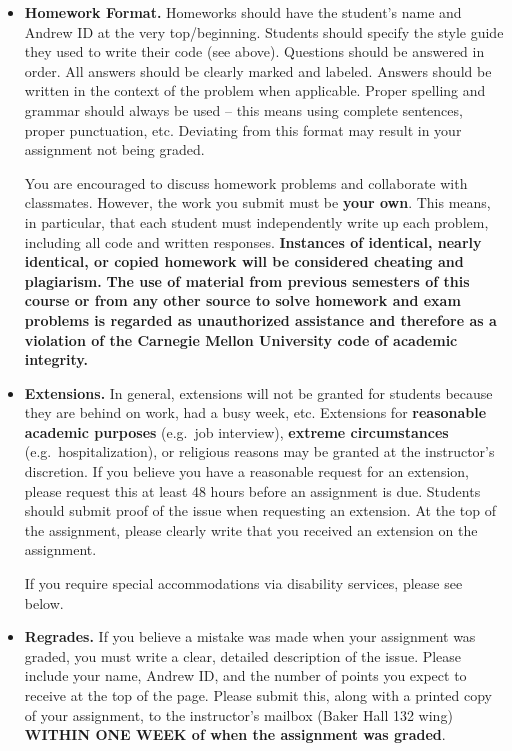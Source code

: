 \documentclass[11pt]{article}
\begin{document}
\begin{itemize}
\item {\bf Homework Format.}  Homeworks should have the student's name and Andrew ID at the very top/beginning.  Students should specify the style guide they used to write their code (see above).  Questions should be answered in order.  All answers should be clearly marked and labeled.  Answers should be written in the context of the problem when applicable.  Proper spelling and grammar should always be used -- this means using complete sentences, proper punctuation, etc.  Deviating from this format may result in your assignment not being graded.

You are encouraged to discuss homework problems and collaborate with classmates.  However, the work you submit must be {\bf your own}.  This means, in
particular, that each student must independently write up each problem, including all code and written responses.  {\bf Instances of identical, nearly identical, or copied homework will be considered cheating and plagiarism.}  {\bf The use of material from previous semesters of this course or from any other source to solve homework and exam problems is regarded as unauthorized assistance and therefore as a violation of the Carnegie Mellon University code of academic integrity.}

\item {\bf Extensions.}  In general, extensions will not be granted for students because they are behind on work, had a busy week, etc.  Extensions for \textbf{reasonable academic purposes} (e.g.\ job interview), \textbf{extreme circumstances} (e.g.\ hospitalization), or religious reasons may be granted at the instructor's discretion. If you believe you have a reasonable request for an extension, please request this at least 48 hours before an assignment is due. Students should submit proof of the issue when requesting an extension.  At the top of the assignment, please clearly write that you received an extension on the assignment.

If you require special accommodations via disability services, please see below.

\item {\bf Regrades.}  If you believe a mistake was made when your assignment was graded, you must write a clear, detailed description of the issue.  Please include your name, Andrew ID, and the number of points you expect to receive at the top of the page.  Please submit this, along with a printed copy of your assignment, to the instructor's mailbox (Baker Hall 132 wing) \textbf{WITHIN ONE WEEK of when the assignment was graded}.  


\end{itemize}
\end{document}
